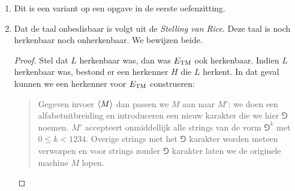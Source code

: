 \documentclass[a4paper]{article}
\begin{document}
\begin{question}
\begin{answer}
\begin{enumerate}
\begin{proof}
  \paragraph{}
  Bijgevolg mappen $v$ en $y$ op (delen van) de getallen. Indien beide groepen op eenzelfde nummer zouden mappen, blazen we \'e\'en nummer op, terwijl ofwel de som, ofwel de operanden niet volgen. Vermits er geen $0$ vooraan in de getallen van een optelling staan, staat het opblazen van een getal gelijk met het groter worden van dat getal, bijgevolg moet de som de operand volgen. Het is dus onmogelijk dat $v$ en $y$ tot hetzelfde getal behoren.
  \paragraph{}
  Dan blijft enkel nog het geval over dat $v$ en $y$ tot een verschillend getal behoren. Dit kunnen niet de twee laatste getallen zijn: dit zou de operanden opblazen terwijl de som niet volgt, wat tot onjuiste sommen zou leiden. De som ($a$) en de tweede operand ($c$) gaat ook niet omdat er teveel karakters tussen $a$ en $c$ staan (meer dan $p$). Bijgevolg is de enige mogelijkheid dat $v$ tot de som ($a$) behoort en $y$ tot de eerste operand ($b$). Stel dat $b$ wordt ``gepompt'', dan komt er dus minstens \'e\'en $1$ bij, op plaatsen waar al een $1$ staat bij $c$, dit resulteert dus in minstens \'e\'en $0$ in de som, maar de som kan geen $0$ bevatten, omdat $a$ oorspronkelijk geen $0$ bevatte. Stel dat we de som pompen, dan komt er dus minstens \'e\'en $1$ bij. Dit impliceert dus dat $b$ gelijk zou worden aan $1^k0^p1^p$ (met $k$ het aantal $1$en die erbij komen), maar $b$ bevat geen $0$en, dus inconsistentie.
 \end{proof}
 \item Dit is een variant op een opgave in de eerste oefenzitting.
 \item Dat de taal onbeslisbaar is volgt uit de \emph{Stelling van Rice}. Deze taal is noch herkenbaar noch onherkenbaar. We bewijzen beide.
 \begin{proof}
  Stel dat $L$ herkenbaar was, dan was $E_{\rm TM}$ ook herkenbaar. Indien $L$ herkenbaar was, bestond er een herkenner $H$ die $L$ herkent. In dat geval kunnen we een herkenner voor $E_{\rm TM}$ construeren:
  \begin{quote}
   Gegeven invoer $\left\langle M \right\rangle$ dan passen we $M$ aan naar $M'$: we doen een alfabetuitbreiding en introduceren een nieuw karakter die we hier $\Game$ noemen. $M'$ accepteert onmiddellijk alle strings van de vorm $\Game^k$ met $0\leq k<1234$. Overige strings met het $\Game$ karakter worden meteen verworpen en voor strings zonder $\Game$ karakter laten we de originele machine $M$ lopen.

\end{quote}
\end{proof}
\end{enumerate}
\end{answer}
\end{question}
\end{document}
